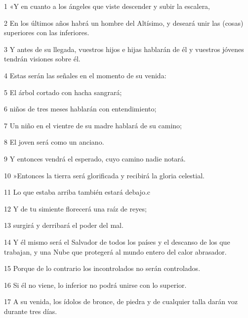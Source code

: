 \par 1 «Y en cuanto a los ángeles que viste descender y subir la escalera,

\par 2 En los últimos años habrá un hombre del Altísimo, y deseará unir las (cosas) superiores con las inferiores.

\par 3 Y antes de su llegada, vuestros hijos e hijas hablarán de él y vuestros jóvenes tendrán visiones sobre él.

\par 4 Estas serán las señales en el momento de su venida:

\par 5 El árbol cortado con hacha sangrará;

\par 6 niños de tres meses hablarán con entendimiento;

\par 7 Un niño en el vientre de su madre hablará de su camino;

\par 8 El joven será como un anciano.

\par 9 Y entonces vendrá el esperado, cuyo camino nadie notará.

\par 10 »Entonces la tierra será glorificada y recibirá la gloria celestial.

\par 11 Lo que estaba arriba también estará debajo.c

\par 12 Y de tu simiente florecerá una raíz de reyes;

\par 13 surgirá y derribará el poder del mal.

\par 14 Y él mismo será el Salvador de todos los países y el descanso de los que trabajan, y una Nube que protegerá al mundo entero del calor abrasador.

\par 15 Porque de lo contrario los incontrolados no serán controlados.

\par 16 Si él no viene, lo inferior no podrá unirse con lo superior.

\par 17 A su venida, los ídolos de bronce, de piedra y de cualquier talla darán voz durante tres días.

